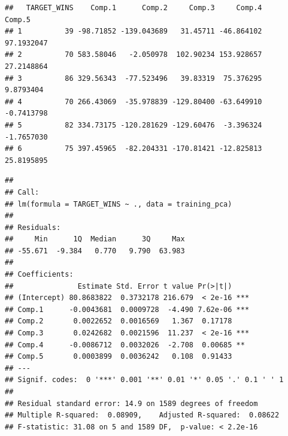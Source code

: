 \documentclass[]{article}
\newenvironment{Shaded}{\begin{snugshade}}{\end{snugshade}}
\newcommand{\KeywordTok}[1]{\textcolor[rgb]{0.13,0.29,0.53}{\textbf{{#1}}}}
\newcommand{\DataTypeTok}[1]{\textcolor[rgb]{0.13,0.29,0.53}{{#1}}}
\newcommand{\DecValTok}[1]{\textcolor[rgb]{0.00,0.00,0.81}{{#1}}}
\newcommand{\FloatTok}[1]{\textcolor[rgb]{0.00,0.00,0.81}{{#1}}}
\newcommand{\StringTok}[1]{\textcolor[rgb]{0.31,0.60,0.02}{{#1}}}
\newcommand{\CommentTok}[1]{\textcolor[rgb]{0.56,0.35,0.01}{\textit{{#1}}}}
\newcommand{\OtherTok}[1]{\textcolor[rgb]{0.56,0.35,0.01}{{#1}}}
\newcommand{\NormalTok}[1]{{#1}}
\begin{document}
\begin{verbatim}
##   TARGET_WINS    Comp.1      Comp.2     Comp.3     Comp.4     Comp.5
## 1          39 -98.71852 -139.043689   31.45711 -46.864102 97.1932047
## 2          70 583.58046   -2.050978  102.90234 153.928657 27.2148864
## 3          86 329.56343  -77.523496   39.83319  75.376295  9.8793404
## 4          70 266.43069  -35.978839 -129.80400 -63.649910 -0.7413798
## 5          82 334.73175 -120.281629 -129.60476  -3.396324 -1.7657030
## 6          75 397.45965  -82.204331 -170.81421 -12.825813 25.8195895
\end{verbatim}

\begin{Shaded}
\end{Shaded}

\begin{verbatim}
## 
## Call:
## lm(formula = TARGET_WINS ~ ., data = training_pca)
## 
## Residuals:
##     Min      1Q  Median      3Q     Max 
## -55.671  -9.384   0.770   9.790  63.983 
## 
## Coefficients:
##               Estimate Std. Error t value Pr(>|t|)    
## (Intercept) 80.8683822  0.3732178 216.679  < 2e-16 ***
## Comp.1      -0.0043681  0.0009728  -4.490 7.62e-06 ***
## Comp.2       0.0022652  0.0016569   1.367  0.17178    
## Comp.3       0.0242682  0.0021596  11.237  < 2e-16 ***
## Comp.4      -0.0086712  0.0032026  -2.708  0.00685 ** 
## Comp.5       0.0003899  0.0036242   0.108  0.91433    
## ---
## Signif. codes:  0 '***' 0.001 '**' 0.01 '*' 0.05 '.' 0.1 ' ' 1
## 
## Residual standard error: 14.9 on 1589 degrees of freedom
## Multiple R-squared:  0.08909,    Adjusted R-squared:  0.08622 
## F-statistic: 31.08 on 5 and 1589 DF,  p-value: < 2.2e-16
\end{verbatim}
\end{document}
